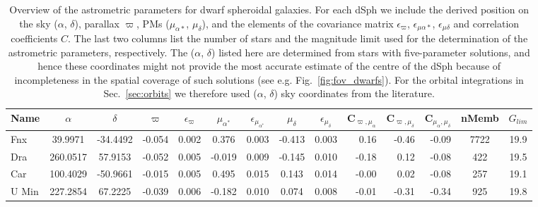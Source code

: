 \documentclass{article}
\begin{document}
\begin{table*}
\footnotesize
\caption{Overview of the astrometric parameters for dwarf spheroidal galaxies. For each dSph we include the derived position on the sky ($\alpha$, $\delta$), parallax $\varpi$, PMs ($\mu_{\alpha*}$, $\mu_\delta$), and the elements of the covariance matrix $\epsilon_\varpi$, $\epsilon_{\mu\alpha *}$, $\epsilon_{\mu\delta}$ and correlation coefficients $C$. The last two columns list the number of stars and the magnitude limit used for the determination of the astrometric parameters, respectively. The ($\alpha$, $\delta$) listed here are determined from stars with five-parameter solutions, and hence these coordinates might not provide the most accurate estimate of the centre of the dSph because of incompleteness in the spatial coverage of such solutions (see e.g. Fig.~\ref{fig:fov_dwarfs}). For the orbital integrations in Sec.~\ref{sec:orbits} we therefore
used ($\alpha$, $\delta$) sky coordinates from the literature.}\label{tab:PM_dwarfs} %
\begin{tabular}{lccccccccrrrcc}%
\hline
Name & $\alpha$ & $\delta$ & $\varpi$ & $\epsilon_\varpi $  & $\mu_{\alpha^*}$ & $\epsilon_{\mu_{\alpha^*}}$ &  $\mu_\delta$ &  $\epsilon_{\mu_\delta}$  &  C$_{\varpi,\mu_\alpha}$ &  C$_{\varpi,\mu_\delta}$ &  C$_{\mu_\alpha,\mu_\delta}$ & nMemb & $G_{lim}$\\
\hline
Fnx  &  39.9971 & -34.4492   & -0.054  & 0.002           &           0.376        &             0.003        &       -0.413     &        0.003        &    0.16             &   -0.46       &            -0.09    &       7722  & 19.9\\
Dra   &  260.0517  & 57.9153  & -0.052  & 0.005          &           -0.019      &               0.009        &       -0.145     &       0.010       &    -0.18         &        0.12         &          -0.08        &     422 &  19.5 \\
Car   & 100.4029 & -50.9661  & -0.015  &  0.005      &                0.495        &             0.015         &       0.143     &        0.014      &     -0.00      &           0.02        &           -0.08    &         257  &  19.1 \\
U Min & 227.2854 & 67.2225  & -0.039  &  0.006             &       -0.182        &             0.010      &           0.074      &       0.008    &      -0.01      &          -0.31      &            -0.34       &      925 &   19.8 \\

\end{tabular}
\end{table*}
\end{document}
